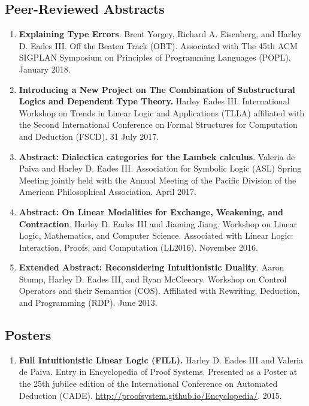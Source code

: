 \documentclass{article}
\begin{document}
  \subsection{Peer-Reviewed Abstracts}
  \label{subsec:abstracts}
  \begin{enumerate}

  \item \textbf{Explaining Type Errors}.  Brent Yorgey, Richard
    A. Eisenberg, and Harley D. Eades III. Off the Beaten Track
    (OBT). Associated with The 45th ACM SIGPLAN Symposium on
    Principles of Programming Languages (POPL). January 2018.
    
  \item \textbf{Introducing a New Project on The Combination of
    Substructural Logics and Dependent Type Theory.} Harley Eades III.
    International Workshop on Trends in Linear Logic and Applications
    (TLLA) affiliated with the Second International Conference on
    Formal Structures for Computation and Deduction (FSCD). 31 July
    2017.
    
  \item \textbf{Abstract: Dialectica categories for the Lambek
    calculus}.  Valeria de Paiva and Harley D. Eades III. Association for
    Symbolic Logic (ASL) Spring Meeting jointly held with the Annual
    Meeting of the Pacific Division of the American Philosophical
    Association.  April 2017.
    
  \item \textbf{Abstract: On Linear Modalities for Exchange,
    Weakening, and Contraction}.  Harley D. Eades III and Jiaming Jiang.
    Workshop on Linear Logic, Mathematics, and Computer
    Science. Associated with Linear Logic: Interaction, Proofs, and
    Computation (LL2016).  November 2016.

  \item \textbf{Extended Abstract: Reconsidering Intuitionistic
    Duality}.  Aaron Stump, Harley D. Eades III, and Ryan
    McCleeary. Workshop on Control Operators and their Semantics
    (COS).  Affiliated with Rewriting, Deduction, and Programming
    (RDP). June 2013.
  \end{enumerate}
  
  \subsection{Posters}
  \label{subsec:posters}
  \begin{enumerate}
  \item \textbf{Full Intuitionistic Linear Logic (FILL).} Harley D. Eades
    III and Valeria de Paiva. Entry in Encyclopedia of Proof
    Systems. Presented as a Poster at the 25th jubilee edition of the
    International Conference on Automated Deduction (CADE). \url{http://proofsystem.github.io/Encyclopedia/}. 2015.
  \end{enumerate}
\end{document}
